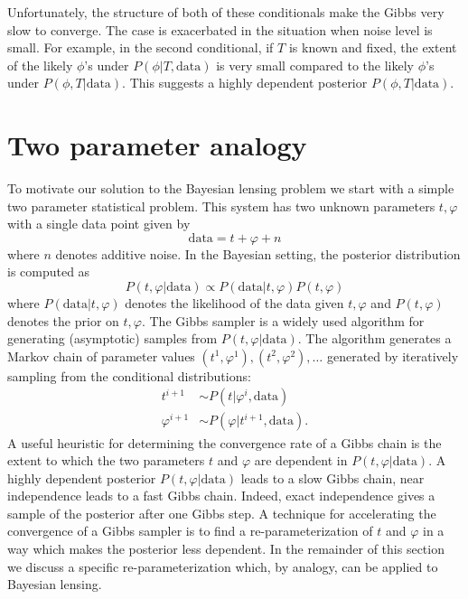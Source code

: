 \documentclass[noinfoline]{imsart}
\begin{document}
Unfortunately, the structure of both of these conditionals make the Gibbs very slow to converge. The case is exacerbated in the situation when noise level is small. For example, in the second conditional, if $T$ is known and fixed, the extent of the likely $\phi$'s under $P(\phi|T,\text{data})$  is very small compared to the likely $\phi$'s under $P(\phi, T| \text{data})$. 
This suggests a highly dependent posterior $P(\phi, T| \text{data})$. 










%
%
\section{Two parameter analogy}
\label{two parameter system}


To motivate our solution to the Bayesian lensing problem we start with a simple two parameter statistical problem.  This system has two unknown parameters $ t, \varphi$ with a single data point given by
\[\text{data} =  t + \varphi + n\]
where $n$ denotes additive noise.  In the Bayesian setting, the posterior distribution is computed as 
\begin{equation}
\label{post1}
 P( t,\varphi|\text{data})\propto P(\text{data}| t, \varphi) P( t,\varphi) 
 \end{equation}
where $P(\text{data}| t, \varphi)$ denotes the likelihood of the data given  $ t, \varphi$ and $P( t,\varphi)$ denotes the  prior on $ t, \varphi$. 
The Gibbs sampler is a widely used algorithm for generating (asymptotic) samples from  $P( t, \varphi|\text{data})$. The algorithm generates a Markov chain of parameter values $( t^{1}, \varphi^{1}), ( t^{2}, \varphi^{2}),\ldots$ generated by iteratively sampling from the conditional distributions:
\begin{align*}
 t^{i+1} &\sim P( t|\varphi^{i},\text{data}) \\
\varphi^{i+1}   &\sim P(\varphi| t^{i+1},\text{data}).
\end{align*}
A useful heuristic for determining the convergence rate of a Gibbs chain is the extent to which the two parameters $ t$ and $\varphi$ are dependent in $P(t, \varphi|\text{data})$. A highly dependent posterior $P( t, \varphi|\text{data})$ leads to a slow Gibbs chain, near independence leads to a fast Gibbs chain. Indeed, exact independence gives a sample of the posterior after one Gibbs step.  A technique for accelerating the convergence of a Gibbs sampler is to find a  re-parameterization of $ t$ and $\varphi$ in a way which makes the posterior less dependent. In the remainder of this section we discuss a specific re-parameterization which, by analogy, can be applied to Bayesian lensing.
\end{document}
